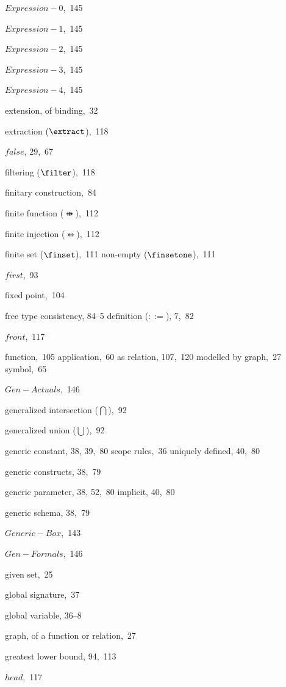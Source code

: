 \begin{theindex}
\item \(Expression-0\),~145
\item \(Expression-1\),~145
\item \(Expression-2\),~145
\item \(Expression-3\),~145
\item \(Expression-4\),~145
\item extension, of binding,~32
\item extraction ($\extract$),~118
\indexspace %
\item $false$, 29,~67
\item filtering ($\filter$),~118
\item finitary construction,~84
\item finite function ($\ffun$),~112
\item finite injection ($\finj$),~112
\item finite set ($\finset$),~111
  \subitem non-empty ($\finsetone$),~111
\item $first$,~93
\item fixed point,~104
\item free type
  \subitem consistency, 84--5
  \subitem definition ($::=$), 7,~82
\item $front$,~117
\item function,~105
  \subitem application,~60
  \subitem as relation, 107,~120
  \subitem modelled by graph,~27
  \subitem symbol,~65
\indexspace %
\item \(Gen-Actuals\),~146
\item generalized intersection ($\bigcap$),~92
\item generalized union ($\bigcup$),~92
\item generic constant, 38, 39,~80
  \subitem scope rules,~36
  \subitem uniquely defined, 40,~80
\item generic constructs, 38,~79
\item generic parameter, 38, 52,~80
  \subitem implicit, 40,~80
\item generic schema, 38,~79
\item \(Generic-Box\),~143
\item \(Gen-Formals\),~146
\item given set,~25
\item global signature,~37
\item global variable, 36--8
\item graph, of a function or relation,~27
\item greatest lower bound, 94,~113
\indexspace %
\item $head$,~117

\end{theindex}
